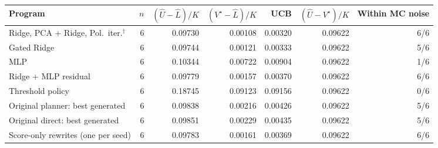 \begin{tabular}{l r rrrr r}
\toprule
Program & $n$ & $(\hat U-\hat L)/K$ & $(V^\star-\hat L)/K$ & UCB & $(\hat U-V^\star)/K$ & Within MC noise \\
\midrule
Ridge, PCA + Ridge, Pol.\ iter.$^\dagger$ & 6 & 0.09730 & 0.00108 & 0.00320 & 0.09622 & 6/6 \\
Gated Ridge & 6 & 0.09744 & 0.00121 & 0.00333 & 0.09622 & 5/6 \\
MLP & 6 & 0.10344 & 0.00722 & 0.00904 & 0.09622 & 1/6 \\
Ridge + MLP residual & 6 & 0.09779 & 0.00157 & 0.00370 & 0.09622 & 6/6 \\
Threshold policy & 6 & 0.18745 & 0.09123 & 0.09156 & 0.09622 & 0/6 \\
Original planner: best generated & 6 & 0.09838 & 0.00216 & 0.00426 & 0.09622 & 5/6 \\
Original direct: best generated & 6 & 0.09851 & 0.00229 & 0.00435 & 0.09622 & 5/6 \\
Score-only rewrites (one per seed) & 6 & 0.09783 & 0.00161 & 0.00369 & 0.09622 & 6/6 \\
\bottomrule
\end{tabular}
